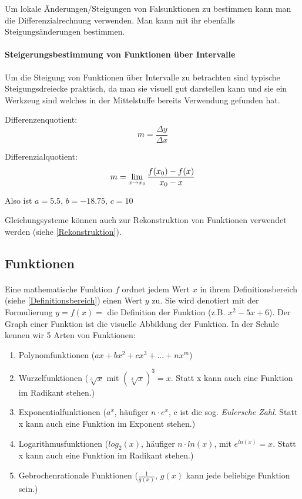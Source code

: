 \documentclass{article}
\begin{document}
			Um lokale Änderungen/Steigungen von Falsunktionen zu bestimmen kann man die Differenzialrechnung verwenden.
			Man kann mit ihr ebenfalls Steigungsänderungen bestimmen.
		\paragraph{Steigerungsbestimmung von Funktionen über Intervalle}
			
			Um die Steigung von Funktionen über Intervalle zu betrachten sind typische Steigungsdreiecke praktisch,
			da man sie visuell gut darstellen kann und sie ein Werkzeug sind welches in der Mittelstuffe bereits
			Verwendung gefunden hat.
			
			Differenzenquotient:
			\[
			    m = {\frac {\Delta y} {\Delta x}}
			\]
			
			Differenzialquotient:
			\[
			    m = \lim_{x \to x_{0}} {{f(x_{0}) - f(x)} \over { x_{0} - x}}
			\]

			Also ist $a=5.5$, $b=-18.75$, $c=10$

			Gleichungsysteme können auch zur Rekonstruktion von Funktionen verwendet werden (siehe \ref{Rekonstruktion}). 

	\subsection{Funktionen}
		\paragraph{}
			Eine mathematische Funktion $f$ ordnet jedem Wert $x$ in ihrem Definitionsbereich (siehe \ref{Definitionsbereich})
			einen Wert $y$ zu. Sie wird denotiert mit der Formulierung $y=f(x)= $ die Definition der Funktion (z.B. $x^2-5x+6$).
			Der Graph einer Funktion ist die visuelle Abbildung der Funktion. In der Schule kennen wir 5 Arten von Funktionen:
			\begin{enumerate}
			    \item Polynomfunktionen ($ax+bx^2+cx^3+...+nx^m$)
			    \item Wurzelfunktionen ($ \sqrt[3]{x} $ mit $ (\sqrt[3]{x})^3=x $. Statt x kann auch eine Funktion im Radikant stehen.)
			    \item Exponentialfunktionen ($a^{x}$, häufiger $n \cdot e^x$, e ist die sog. \emph{Eulersche Zahl}. Statt x kann auch eine Funktion im Exponent stehen.)
			    \item Logarithmusfunktionen ($log_2(x)$, häufiger $n \cdot ln(x)$, mit $e^{ln(x)}=x$. Statt x kann auch eine Funktion im Radikant stehen.)
			    \item Gebrochenrationale Funktionen ($\frac{1}{g(x)}$, $g(x)$ kann jede beliebige Funktion sein.)
			
			\end{enumerate}
\end{document}
